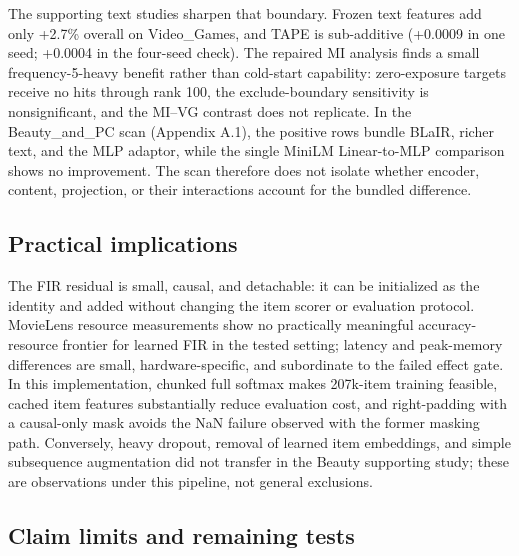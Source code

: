 The supporting text studies sharpen that boundary. Frozen text features add only +2.7\% overall on Video\_Games, and TAPE is sub-additive (+0.0009 in one seed; +0.0004 in the four-seed check). The repaired MI analysis finds a small frequency-5-heavy benefit rather than cold-start capability: zero-exposure targets receive no hits through rank 100, the exclude-boundary sensitivity is nonsignificant, and the MI--VG contrast does not replicate. In the Beauty\_and\_PC scan (Appendix A.1), the positive rows bundle BLaIR, richer text, and the MLP adaptor, while the single MiniLM Linear-to-MLP comparison shows no improvement. The scan therefore does not isolate whether encoder, content, projection, or their interactions account for the bundled difference.

\subsection{Practical implications}\label{sec:6.2}

The FIR residual is small, causal, and detachable: it can be initialized as the identity and added without changing the item scorer or evaluation protocol. MovieLens resource measurements show no practically meaningful accuracy-resource frontier for learned FIR in the tested setting; latency and peak-memory differences are small, hardware-specific, and subordinate to the failed effect gate. In this implementation, chunked full softmax makes 207k-item training feasible, cached item features substantially reduce evaluation cost, and right-padding with a causal-only mask avoids the NaN failure observed with the former masking path. Conversely, heavy dropout, removal of learned item embeddings, and simple subsequence augmentation did not transfer in the Beauty supporting study; these are observations under this pipeline, not general exclusions.

\subsection{Claim limits and remaining tests}\label{sec:6.3}

